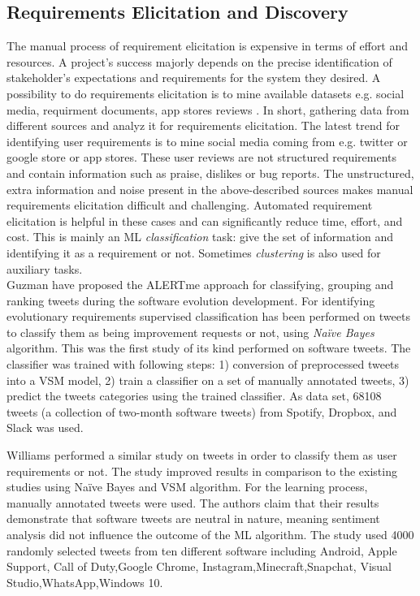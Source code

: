 
\subsection{Requirements Elicitation and Discovery}

The manual process of requirement elicitation is expensive in terms of
effort and resources. A project's success majorly depends
on the precise identification of stakeholder's expectations and requirements for
the system they desired.
A possibility to do requirements elicitation is to mine available datasets e.g.
social media, requirment documents, app stores reviews . In short, gathering data from different
sources and analyz it for requirements elicitation. The latest trend for
identifying user requirements is to mine social media coming from e.g. twitter or
google store or app stores. These user reviews are not structured requirements
and contain information such as praise, dislikes or bug reports. The
unstructured, extra information and noise present in the above-described
sources makes manual requirements elicitation difficult and challenging.
Automated requirement elicitation is helpful in these cases and can
significantly reduce time, effort, and cost. This is mainly an ML
\emph{classification} task: give the set of information and identifying it as a
requirement or not. Sometimes \emph{clustering} is also used for auxiliary
tasks.\\

Guzman \etal \cite{Guzman:2017} have proposed the ALERTme approach for
classifying, grouping and ranking tweets during the software
evolution development. For identifying evolutionary
requirements supervised
classification has been performed on tweets to classify them as being
improvement requests or not, using \emph{Naïve Bayes} algorithm. This was the first study of
its kind performed on software tweets. 
The classifier was trained with following steps: 1) conversion of
preprocessed tweets into a VSM model, 2) train a classifier
on a set of manually annotated tweets, 3) predict the tweets categories using the trained classifier.
As data set, 68108 tweets (a collection of two-month software tweets) from
Spotify, Dropbox, and Slack was used.

Williams \etal \cite{Williams:2017} performed a similar study on tweets in order
to classify them as user requirements or not. The study improved results in
comparison to the existing studies using Naïve Bayes and VSM algorithm. For the learning
process, manually annotated tweets were used. The authors claim that their results demonstrate that
software tweets are neutral in nature, meaning sentiment analysis did not
influence the outcome of the ML algorithm.
The study used 4000 randomly selected tweets from ten different
software including Android, Apple Support, Call of Duty,Google Chrome, Instagram,Minecraft,Snapchat, Visual Studio,WhatsApp,Windows 10.\\


